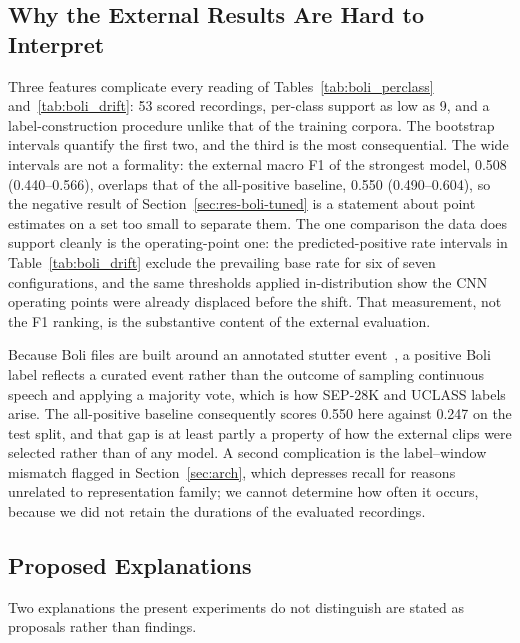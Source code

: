 \documentclass[a4paper,orivec]{llncs}
\begin{document}
\subsection{Why the External Results Are Hard to Interpret}
\label{sec:interpret}
Three features complicate every reading of Tables~\ref{tab:boli_perclass}
and~\ref{tab:boli_drift}: 53 scored recordings, per-class support as low as 9, and
a label-construction procedure unlike that of the training corpora. The bootstrap
intervals quantify the first two, and the third is the most consequential. The
wide intervals are not a formality: the external macro F1 of the strongest model,
0.508 (0.440--0.566), overlaps that of the all-positive baseline, 0.550
(0.490--0.604), so the negative result of Section~\ref{sec:res-boli-tuned} is a
statement about point estimates on a set too small to separate them. The one
comparison the data does support cleanly is the operating-point one: the
predicted-positive rate intervals in Table~\ref{tab:boli_drift} exclude the
prevailing base rate for six of seven configurations, and the same thresholds
applied in-distribution show the CNN operating points were already displaced
before the shift. That measurement, not the F1 ranking, is the substantive content
of the external evaluation.

Because Boli files are built around an annotated stutter
event~\cite{boli2025}, a positive Boli label reflects a curated event rather
than the outcome of sampling continuous speech and applying a majority vote,
which is how SEP-28K and UCLASS labels arise. The all-positive baseline
consequently scores 0.550 here against 0.247 on the test split, and that gap is at
least partly a property of how the external clips were selected rather than of any
model. A second complication is the label--window mismatch flagged in
Section~\ref{sec:arch}, which depresses recall for reasons unrelated to
representation family; we cannot determine how often it occurs, because we did
not retain the durations of the evaluated recordings.

\subsection{Proposed Explanations}
\label{sec:hypotheses}
Two explanations the present experiments do not distinguish are stated as
proposals rather than findings.
\end{document}
